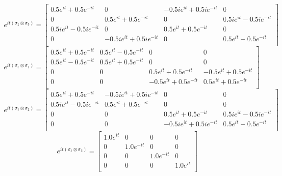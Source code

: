 \documentclass{article}
\begin{document}
\[ e^{it(\sigma_2 \otimes \sigma_3)} = \left[
    \begin{array}{cccc}
    0.5e^{it} + 0.5e^{-it} & 0 & -0.5ie^{it} + 0.5ie^{-it} & 0 \\
    0 & 0.5e^{it} + 0.5e^{-it} & 0 & 0.5ie^{it} - 0.5ie^{-it} \\
    0.5ie^{it} - 0.5ie^{-it} & 0 & 0.5e^{it} + 0.5e^{-it} & 0 \\
    0 & -0.5ie^{it} + 0.5ie^{-it} & 0 & 0.5e^{it} + 0.5e^{-it} \\
    \end{array}
    \right] \] 
\[ e^{it(\sigma_3 \otimes \sigma_1)} = \left[
    \begin{array}{cccc}
    0.5e^{it} + 0.5e^{-it} & 0.5e^{it} - 0.5e^{-it} & 0 & 0 \\
    0.5e^{it} - 0.5e^{-it} & 0.5e^{it} + 0.5e^{-it} & 0 & 0 \\
    0 & 0 & 0.5e^{it} + 0.5e^{-it} & -0.5e^{it} + 0.5e^{-it} \\
    0 & 0 & -0.5e^{it} + 0.5e^{-it} & 0.5e^{it} + 0.5e^{-it} \\
    \end{array}
    \right] \] 
\[ e^{it(\sigma_3 \otimes \sigma_2)} = \left[
    \begin{array}{cccc}
    0.5e^{it} + 0.5e^{-it} & -0.5ie^{it} + 0.5ie^{-it} & 0 & 0 \\
    0.5ie^{it} - 0.5ie^{-it} & 0.5e^{it} + 0.5e^{-it} & 0 & 0 \\
    0 & 0 & 0.5e^{it} + 0.5e^{-it} & 0.5ie^{it} - 0.5ie^{-it} \\
    0 & 0 & -0.5ie^{it} + 0.5ie^{-it} & 0.5e^{it} + 0.5e^{-it} \\
    \end{array}
    \right] \] 
\[ e^{it(\sigma_3 \otimes \sigma_3)} = \left[
    \begin{array}{cccc}
    1.0e^{it} & 0 & 0 & 0 \\
    0 & 1.0e^{-it} & 0 & 0 \\
    0 & 0 & 1.0e^{-it} & 0 \\
    0 & 0 & 0 & 1.0e^{it} \\
    \end{array}
    \right] \] 
\end{document}
